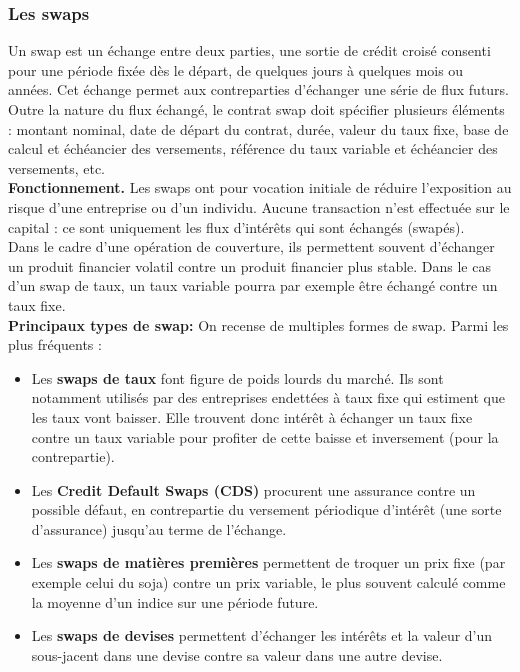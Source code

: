\documentclass[a4paper]{article}
\begin{document}
\subsubsection{Les swaps}
Un swap est un échange entre deux parties, une sortie de crédit croisé consenti pour une période fixée dès le départ, de quelques jours à quelques mois ou années. Cet échange permet aux contreparties d'échanger une série de flux futurs. Outre la nature du flux échangé, le contrat swap doit spécifier plusieurs éléments : montant nominal, date de départ du contrat, durée, valeur du taux fixe, base de calcul et échéancier des versements, référence du taux variable et échéancier des versements, etc.
\vspace{2mm} \\
\textbf{Fonctionnement.} Les swaps ont pour vocation initiale de réduire l’exposition au risque d’une entreprise ou d’un individu. Aucune transaction n’est effectuée sur le capital : ce sont uniquement les flux d’intérêts qui sont échangés (swapés). \\
Dans le cadre d’une opération de couverture, ils permettent souvent d’échanger un produit financier volatil contre un produit financier plus stable. Dans le cas d’un swap de taux, un taux variable pourra par exemple être échangé contre un taux fixe.
\vspace{2mm} \\
\textbf{Principaux types de swap:} On recense de multiples formes de swap. Parmi les plus fréquents :
\begin{itemize}
    \item Les \textbf{swaps de taux} font figure de poids lourds du marché. Ils sont notamment utilisés par des entreprises endettées à taux fixe qui estiment que les taux vont baisser. Elle trouvent donc intérêt à échanger un taux fixe contre un taux variable pour profiter de cette baisse et inversement (pour la contrepartie).
    \item Les \textbf{Credit Default Swaps (CDS)} procurent une assurance contre un possible défaut, en contrepartie du versement périodique d’intérêt (une sorte d’assurance) jusqu’au terme de l’échange.
    \item Les \textbf{swaps de matières premières} permettent de troquer un prix fixe (par exemple celui du soja) contre un prix variable, le plus souvent calculé comme la moyenne d'un indice sur une période future. 
    \item Les \textbf{swaps de devises} permettent d’échanger les intérêts et la valeur d’un sous-jacent dans une devise contre sa valeur dans une autre devise. 
\end{itemize}
\end{document}
